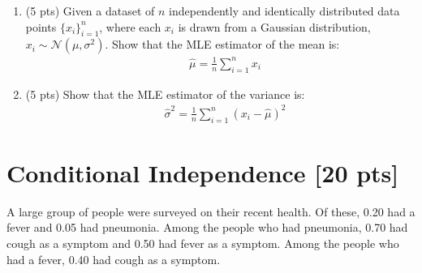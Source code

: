 \documentclass[11pt]{article}
\begin{document}
\begin{enumerate}
\item (5 pts) Given a dataset of 
$n$ independently and identically distributed data points $\{x_i\}_{i=1}^n$, where each $x_i$ is drawn from a Gaussian distribution, $x_i\sim \mathcal{N}(\mu, \sigma^2)$. Show that the MLE estimator of the mean is:
\begin{align}
& \hat{\mu}=\frac{1}{n} \sum_{i=1}^n x_i 
\end{align}
\begin{answertext}{9cm}{}

\end{answertext} 
\newpage
\item (5 pts) Show that the MLE estimator of the variance is: 
\begin{align}
& \hat{\sigma}^2=\frac{1}{n} \sum_{i=1}^n\left(x_i-\widehat{\mu}\right)^2
\end{align}
\begin{answertext}{9cm}{}


  
\end{answertext}

\end{enumerate}

\pagebreak
\section{Conditional Independence [20 pts]}
A large group of people were surveyed on their recent health. Of these, 0.20 had a fever and 0.05 had pneumonia. Among the people who had pneumonia, 0.70 had cough as a symptom and 0.50 had fever as a symptom. Among the people who had a fever, 0.40 had cough as a symptom.
\end{document}

